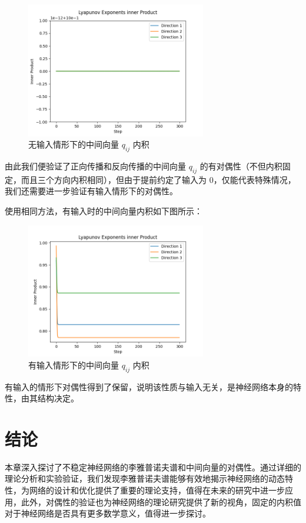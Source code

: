 \clearpage

\begin{figure}[htbp]
  \centering
  \includegraphics[width=0.7\textwidth]{figures/lyapunov_exponents_inner_product.png}
  \caption{无输入情形下的中间向量 $q_{ij}$ 内积}
  \label{fig:inner_product}
\end{figure}

由此我们便验证了正向传播和反向传播的中间向量 $q_{ij}$ 的有对偶性（不但内积固定，而且三个方向内积相同），但由于提前约定了输入为 0，仅能代表特殊情况，我们还需要进一步验证有输入情形下的对偶性。

使用相同方法，有输入时的中间向量内积如下图所示：

\clearpage

\begin{figure}[htbp]
  \centering
  \includegraphics[width=0.7\textwidth]{figures/lyapunov_exponents_inner_product_with_input.png}
  \caption{有输入情形下的中间向量 $q_{ij}$ 内积}
  \label{fig:inner_product_with_input}
\end{figure}

有输入的情形下对偶性得到了保留，说明该性质与输入无关，是神经网络本身的特性，由其结构决定。

\section{结论}

本章深入探讨了不稳定神经网络的李雅普诺夫谱和中间向量的对偶性。通过详细的理论分析和实验验证，我们发现李雅普诺夫谱能够有效地揭示神经网络的动态特性，为网络的设计和优化提供了重要的理论支持，值得在未来的研究中进一步应用，此外，对偶性的验证也为神经网络的理论研究提供了新的视角，固定的内积值对于神经网络是否具有更多数学意义，值得进一步探讨。